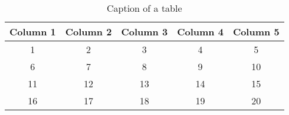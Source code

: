 \begin{table}[htbp]
\centering
\begin{tabular}{||c c c c c||}
\hline
Column 1 & Column 2 & Column 3 & Column 4 & Column 5 \\ 
[0.5ex]
\hline\hline
1  & 2  & 3  & 4  & 5  \\
\hline
6  & 7  & 8  & 9  & 10 \\
\hline
11 & 12 & 13 & 14 & 15 \\
\hline
16 & 17 & 18 & 19 & 20 \\
\hline
\end{tabular}
\label{tab:tab1}
\caption{Caption of a table}
\end{table}

